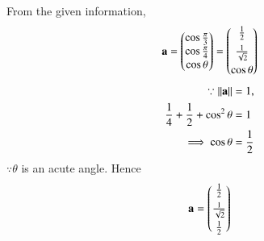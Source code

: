 From the given information,
		\begin{align}
			\mathbf{a}=\begin{pmatrix}\cos\frac{\pi}{3}\\\cos\frac{\pi}{4}\\\cos\theta\end{pmatrix}
			= 
\begin{pmatrix}\frac{1}{2}\\[1ex]\frac{1}{\sqrt{2}}\\[1ex]\cos\theta\end{pmatrix}
		\end{align}
\begin{align}
\because    \left\lVert\mathbf{a}\right\rVert&=1,
\\
\frac{1}{4}+\frac{1}{2}+\cos^2\theta&=1
\\
    \implies\cos\theta &=\frac{1}{2}
\end{align}
$\because \theta$ is an acute angle.
    Hence 
\begin{align}
		\mathbf{a}=\begin{pmatrix}\frac{1}{2}\\[1ex] \frac{1}{\sqrt{2}}\\[1ex] \frac{1}{2}\end{pmatrix}
\end{align}
